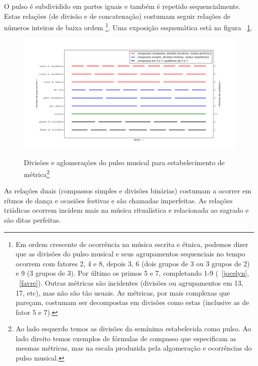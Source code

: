 O pulso é subdividido em partes iguais e também é 
repetido sequencialmente. Estas relações (de divisão e de concatenação) costumam
seguir relações de números inteiros de baixa ordem
\footnote{Em ordem crescente de ocorrência na música
escrita e étnica, podemos
dizer que as divisões do pulso musical e seus agrupamentos
sequenciais no tempo ocorrem com fatores 2, 4 e 8, depois 3, 6 (dois grupos de 3 ou 3 grupos de 2) e 9 (3 grupos de 3). Por 
último os primos 5 e 7, completando 1-9 (~\ref{jocelyn}, ~\ref{favre}).
Outras métricas são incidentes (divisões ou agrupamentos em 13, 17, etc), mas não são tão usuais. As métricas, por mais complexas que pareçam, costumam ser decompostas em divisões como estas (inclusive as de fator 5 e 7).}.
Uma exposição esquemática está na figura ~\ref{fig:pulsoSubAgl}.

\begin{figure}[h!]
    \centering
    \caption{Divisões e aglomerações do pulso musical para estabelecimento de métrica\footnote{Ao lado esquerdo temos as divisões da semínima estabelecida como pulso. Ao lado direito temos exemplos de fórmulas de compasso que especificam as mesmas métricas, mas na escala produzida pela algomeração e ocorrências do pulso musical.}}
        \includegraphics[width=\textwidth]{figuras/metricaMusical}
        \label{fig:pulsoSubAgl}
\end{figure}

As relações duais (compassos simples e divisões binárias) costumam a ocorrer em rítmos de dança
e ocasiões festivas e são chamadas imperfeitas. As relações triádicas ocorrem
incidem mais na música ritualística e relacionada ao sagrado
e são ditas perfeitas.

